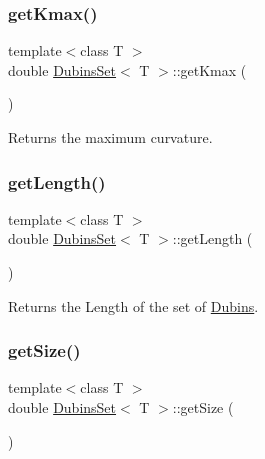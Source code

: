 \mbox{\label{class_dubins_set_af97fa42a6a9a6325c4d1ed4541758272}} 
\subsubsection{\texorpdfstring{getKmax()}{getKmax()}}
{\footnotesize\ttfamily template$<$class T $>$ \\
double \mbox{\hyperlink{class_dubins_set}{Dubins\+Set}}$<$ T $>$\+::get\+Kmax (\begin{DoxyParamCaption}{ }\end{DoxyParamCaption})\hspace{0.3cm}{\ttfamily [inline]}}



Returns the maximum curvature. 

\mbox{\label{class_dubins_set_ad491b5f7e71c3db5ffed11643d2d4e4c}} 
\subsubsection{\texorpdfstring{getLength()}{getLength()}}
{\footnotesize\ttfamily template$<$class T $>$ \\
double \mbox{\hyperlink{class_dubins_set}{Dubins\+Set}}$<$ T $>$\+::get\+Length (\begin{DoxyParamCaption}{ }\end{DoxyParamCaption})\hspace{0.3cm}{\ttfamily [inline]}}



Returns the Length of the set of {\ttfamily \mbox{\hyperlink{class_dubins}{Dubins}}}. 

\mbox{\label{class_dubins_set_a41f7dbb6b82c8822e427ee1a3059b8ca}} 
\subsubsection{\texorpdfstring{getSize()}{getSize()}}
{\footnotesize\ttfamily template$<$class T $>$ \\
double \mbox{\hyperlink{class_dubins_set}{Dubins\+Set}}$<$ T $>$\+::get\+Size (\begin{DoxyParamCaption}{ }\end{DoxyParamCaption})\hspace{0.3cm}{\ttfamily [inline]}}



